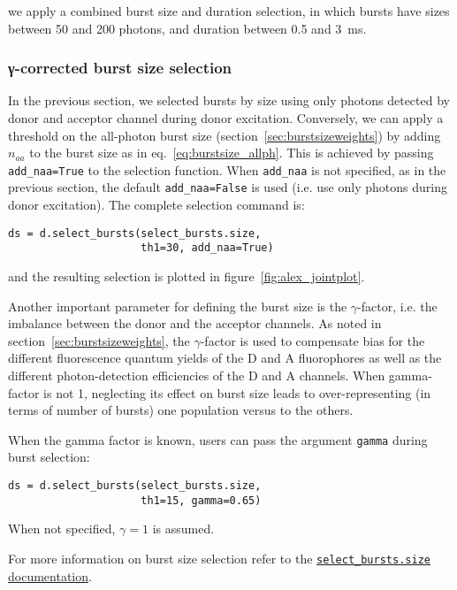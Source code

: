 we apply a combined burst size and duration selection, in which bursts
have sizes between 50 and 200 photons, and duration between 0.5 and 3~ms.

\subsubsection{γ-corrected burst size selection}

In the previous section, we selected bursts by size using only photons
detected by donor and acceptor channel during donor excitation.
Conversely, we can apply a threshold on the all-photon burst size 
(section~\ref{sec:burstsizeweights}) by adding $n_{aa}$ to the burst size
as in eq.~\ref{eq:burstsize_allph}. This is achieved
by passing \verb|add_naa=True| to the selection function. When \verb|add_naa| is not specified,
as in the previous section, the default \verb|add_naa=False| is used
(i.e. use only photons during donor excitation). The complete selection command
is:

\begin{lstlisting}
ds = d.select_bursts(select_bursts.size,
                     th1=30, add_naa=True)
\end{lstlisting}

\noindent and the resulting selection is plotted in figure~\ref{fig:alex_jointplot}.

Another important parameter for defining the burst size is the $\gamma$-factor, i.e.
the imbalance between the donor and the acceptor channels. As noted in
section~\ref{sec:burstsizeweights}, the $\gamma$-factor is
used to compensate bias for the different fluorescence quantum yields of the D and A
fluorophores as well as the different photon-detection efficiencies of the D and A channels.
When gamma-factor is not 1, neglecting its effect on burst size leads to
over-representing (in terms of number of bursts) one population versus to the others.

When the gamma factor is known, users can pass the argument 
\verb|gamma| during burst selection:

\begin{lstlisting}
ds = d.select_bursts(select_bursts.size,
                     th1=15, gamma=0.65)
\end{lstlisting}

When not specified, $\gamma=1$ is assumed.

For more information on burst size selection refer to the
\href{http://fretbursts.readthedocs.org/en/latest/burst_selection.html#fretbursts.select\_bursts.size}{\texttt{select\_bursts.size} documentation}. 

